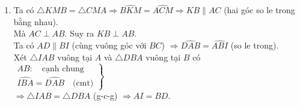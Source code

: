 \begin{vd}
{\begin{enumerate}
{
}
$\Rightarrow \triangle BMC=\triangle AMK$ (c-g-c).\\
$\Rightarrow \widehat{MBC}=\widehat{MAK}$, mà $\widehat{MBC}$ và $\widehat{MAK}$ nằm ở vị trí so le trong.\\
Suy ra $AK\parallel BC$.
\item Ta có $\triangle KMB=\triangle CMA\Rightarrow \widehat{BKM}=\widehat{ACM}\Rightarrow KB\parallel AC$ (hai góc so le trong bằng nhau).\\
Mà $AC\perp AB$. Suy ra $KB\perp AB$.\\
Ta có $AD\parallel BI$ (cùng vuông góc với $BC$) $\Rightarrow \widehat{DAB}=\widehat{ABI}$ (so le trong).\\
Xét $\triangle IAB$ vuông tại $A$ và $\triangle DBA$ vuông tại $B$ có\\
$\left. 
\begin{array}{l} 
AB: \quad \text{cạnh chung}\\
\widehat{IBA}=\widehat{DAB} \quad \text{(cmt)}
\end{array} 
\right\}$\\
$\Rightarrow \triangle IAB=\triangle DBA$ (g-c-g) $\Rightarrow AI=BD$.
\end{enumerate}
}
\end{vd}


